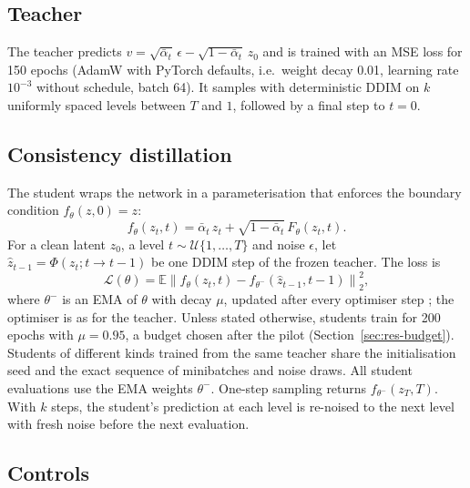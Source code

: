 \documentclass[11pt]{article}
\newcommand{\abar}{\bar\alpha}
\begin{document}
\subsection{Teacher}

The teacher predicts $v=\sqrt{\abar_t}\,\epsilon-\sqrt{1-\abar_t}\,z_0$
\citep{salimans2022progressive} and is trained with an MSE loss for 150 epochs
(AdamW \citep{loshchilov2019adamw} with PyTorch defaults, i.e.\ weight decay 0.01,
learning rate $10^{-3}$ without schedule, batch 64). It samples with deterministic
DDIM \citep{song2021ddim} on $k$ uniformly spaced levels between $T$ and $1$,
followed by a final step to $t=0$.

\subsection{Consistency distillation}

The student wraps the network in a parameterisation that enforces the
boundary condition $f_\theta(z,0)=z$:
\begin{equation}
  f_\theta(z_t,t)=\abar_t\,z_t+\sqrt{1-\abar_t}\,F_\theta(z_t,t).
  \label{eq:student}
\end{equation}
For a clean latent $z_0$, a level $t\sim\mathcal{U}\{1,\dots,T\}$ and noise
$\epsilon$, let $\hat z_{t-1}=\Phi(z_t;t\to t-1)$ be one DDIM step of the frozen
teacher. The loss is
\begin{equation}
  \mathcal{L}(\theta)=\mathbb{E}\left\|f_\theta(z_t,t)-f_{\theta^-}(\hat z_{t-1},t-1)\right\|_2^2,
\end{equation}
where $\theta^-$ is an EMA of $\theta$ with decay $\mu$, updated after every
optimiser step \citep{song2023consistency}; the optimiser is as for the teacher.
Unless stated otherwise, students train for 200 epochs with $\mu=0.95$, a budget
chosen after the pilot (Section~\ref{sec:res-budget}). Students of different
kinds trained from the same teacher share the initialisation seed and the exact
sequence of minibatches and noise draws. All student evaluations use the EMA
weights $\theta^-$. One-step sampling returns $f_{\theta^-}(z_T,T)$. With $k$
steps, the student's prediction at each level is re-noised to the next level with
fresh noise before the next evaluation.

\subsection{Controls}
\label{sec:controls}
\end{document}
